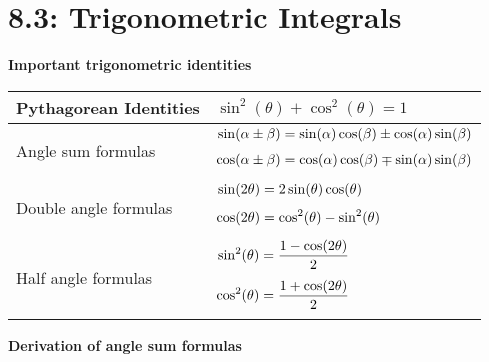 \documentclass[../mathNotesPreamble]{subfiles}
\begin{document}
  \section{8.3: Trigonometric Integrals}
  \textbf{Important trigonometric identities}
  \begin{center}
    \begin{tabularx}{0.9\linewidth}{@{}
      >{\hsize=0.9\hsize}X
      >{\hsize=1.1\hsize}X
      @{}}\toprule
      Pythagorean Identities&
      \vspace*{0.25\baselineskip}
      $\sin^2(\theta)+\cos^2(\theta)=1$\\[4\baselineskip]\midrule
      Angle sum formulas& 
      \vspace*{0.25\baselineskip}
      $\begin{aligned}
        \sin(\alpha\pm\beta)&=\sin(\alpha)\cos(\beta)\pm\cos(\alpha)\sin(\beta)\\[0.25\baselineskip]
        \cos(\alpha\pm\beta)&=\cos(\alpha)\cos(\beta)\mp\sin(\alpha)\sin(\beta)\\[0.25\baselineskip]
      \end{aligned}$\\\midrule
      Double angle formulas&
      \vspace*{0.25\baselineskip}
      $\begin{aligned}
        \sin(2\theta)&=2\sin(\theta)\cos(\theta)\\[0.25\baselineskip]
        \cos(2\theta)&=\cos^2(\theta)-\sin^2(\theta)\\[0.25\baselineskip]
      \end{aligned}$\\\midrule
      Half angle formulas&
      \vspace*{0.25\baselineskip}
      $\begin{aligned}
        \sin^2(\theta)&=\dfrac{1-\cos(2\theta)}{2}\\[0.25\baselineskip]
        \cos^2(\theta)&=\dfrac{1+\cos(2\theta)}{2}\\[0.25\baselineskip]
      \end{aligned}$\\\bottomrule
    \end{tabularx}
  \end{center}
  \pagebreak

  \textbf{Derivation of angle sum formulas}
\end{document}
